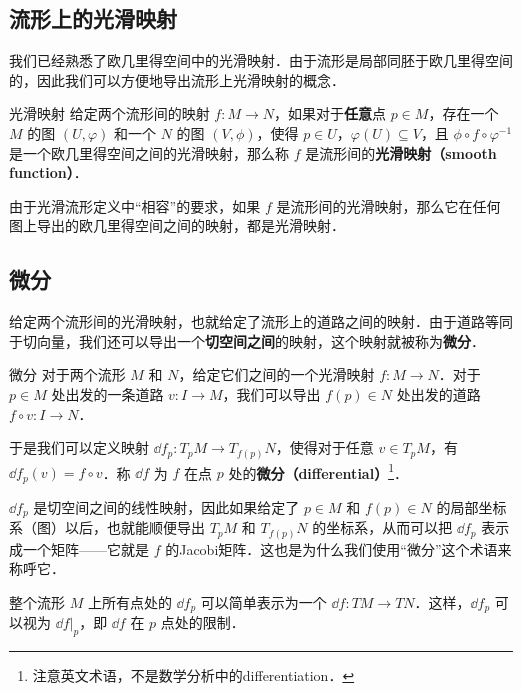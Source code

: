 

\subsection{流形上的光滑映射}

我们已经熟悉了欧几里得空间中的光滑映射．由于流形是局部同胚于欧几里得空间的，因此我们可以方便地导出流形上光滑映射的概念．

\begin{definition}{光滑映射}
给定两个流形间的映射 $f:M\to N$，如果对于\textbf{任意}点 $p\in M$，存在一个 $M$ 的图 $(U, \varphi)$ 和一个 $N$ 的图 $(V, \phi)$，使得 $p\in U$，$\varphi(U)\subseteq V$，且 $\phi\circ f\circ\varphi^{-1}$ 是一个欧几里得空间之间的光滑映射，那么称 $f$ 是流形间的\textbf{光滑映射（smooth function）}．
\end{definition}

由于光滑流形定义中“相容”的要求，如果 $f$ 是流形间的光滑映射，那么它在任何图上导出的欧几里得空间之间的映射，都是光滑映射．


\subsection{微分}

给定两个流形间的光滑映射，也就给定了流形上的道路之间的映射．由于道路等同于切向量，我们还可以导出一个\textbf{切空间之间}的映射，这个映射就被称为\textbf{微分}．

\begin{definition}{微分}
对于两个流形 $M$ 和 $N$，给定它们之间的一个光滑映射 $f:M\to N$．对于 $p\in M$ 处出发的一条道路 $v:I\to M$，我们可以导出 $f(p)\in N$ 处出发的道路 $f\circ v:I\to N$．

于是我们可以定义映射 $\dd f_p: T_pM\to T_{f(p)}N$，使得对于任意 $v\in T_pM$，有 $\dd f_p(v)=f\circ v$．称 $\dd f$ 为 $f$ 在点 $p$ 处的\textbf{微分（differential）}\footnote{注意英文术语，不是数学分析中的differentiation．}．
\end{definition}

$\dd f_p$ 是切空间之间的线性映射，因此如果给定了 $p\in M$ 和 $f(p)\in N$ 的局部坐标系（图）以后，也就能顺便导出 $T_pM$ 和 $T_{f(p)}N$ 的坐标系，从而可以把 $\dd f_p$ 表示成一个矩阵——它就是 $f$ 的Jacobi矩阵．这也是为什么我们使用“微分”这个术语来称呼它．

整个流形 $M$ 上所有点处的 $\dd f_p$ 可以简单表示为一个 $\dd f:TM\to TN$．这样，$\dd f_p$ 可以视为 $\dd f|_p$，即 $\dd f$ 在 $p$ 点处的限制．

